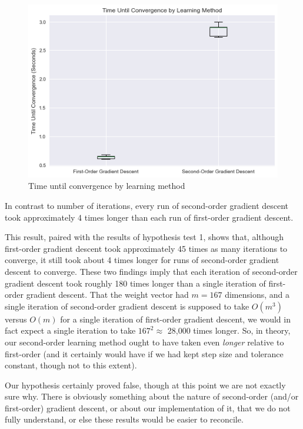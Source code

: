 \documentclass[11pt]{extarticle}
\begin{document}
\begin{figure}[h!]
\begin{center}
    \includegraphics[scale=.7]{time.png}
	\caption{Time until convergence by learning method}    
    \label{fig:x}
\end{center}
\end{figure}

In contrast to number of iterations, every run of second-order gradient descent took approximately 4 times longer than each run of first-order gradient descent.

This result, paired with the results of hypothesis test 1, shows that, although first-order gradient descent took approximately 45 times as many iterations to converge, it still took about 4 times longer for runs of second-order gradient descent to converge. These two findings imply that each iteration of second-order gradient descent took roughly 180 times longer than a single iteration of first-order gradient descent. That the weight vector had $m = 167$ dimensions, and a single iteration of second-order gradient descent is supposed to take $O(m^3)$ versus $O(m)$ for a single iteration of first-order gradient descent, we would in fact expect a single iteration to take $167^2 \approx$ 28,000 times longer. So, in theory, our second-order learning method ought to have taken even \textit{longer} relative to first-order (and it certainly would have if we had kept step size and tolerance constant, though not to this extent).

Our hypothesis certainly proved false, though at this point we are not exactly sure why. There is obviously something about the nature of second-order (and/or first-order) gradient descent, or about our implementation of it, that we do not fully understand, or else these results would be easier to reconcile.
\end{document}
